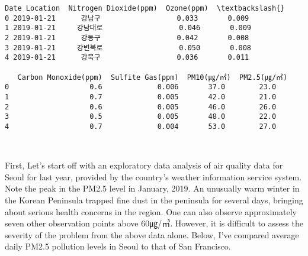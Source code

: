 \documentclass[11pt]{article}
\begin{document}
    \begin{Verbatim}[commandchars=\\\{\}]
        Date Location  Nitrogen Dioxide(ppm)  Ozone(ppm)  \textbackslash{}
0 2019-01-21      강남구                  0.033       0.009   
1 2019-01-21     강남대로                  0.046       0.009   
2 2019-01-21      강동구                  0.042       0.008   
3 2019-01-21     강변북로                  0.050       0.008   
4 2019-01-21      강북구                  0.036       0.011   

   Carbon Monoxide(ppm)  Sulfite Gas(ppm)  PM10(㎍/㎥)  PM2.5(㎍/㎥)  
0                   0.6             0.006       37.0        23.0  
1                   0.7             0.005       42.0        21.0  
2                   0.6             0.005       46.0        26.0  
3                   0.5             0.005       48.0        22.0  
4                   0.7             0.004       53.0        27.0  

    \end{Verbatim}

    \begin{center}
    \end{center}
    { \hspace*{\fill} \\}
    
    First, Let's start off with an exploratory data analysis of air quality
data for Seoul for last year, provided by the country's weather
information service system. Note the peak in the PM2.5 level in January,
2019. An unusually warm winter in the Korean Peninsula trapped fine dust
in the peninsula for several days, bringing about serious health
concerns in the region. One can also observe approximately seven other
observation points above 60㎍/㎥. However, it is difficult to assess the
severity of the problem from the above data alone. Below, I've compared
average daily PM2.5 pollution levels in Seoul to that of San Francisco.
\end{document}
